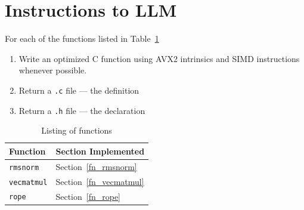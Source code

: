 \documentclass[letterpaper,12pt]{article}
\begin{document}
\section{Instructions to LLM}
For each of the functions listed in Table~\ref{list_of_fns}
\begin{enumerate}
  \item Write an optimized C function using AVX2 intrinsics and SIMD
    instructions whenever possible.
  \item Return a {\tt .c} file --- the definition
  \item Return a {\tt .h} file --- the declaration
\end{enumerate}
\begin{table}
\begin{tabular}{|l|l|} \hline \hline
  {\bf Function} & Section Implemented  \\ \hline \hline
  {\tt rmsnorm} & Section~\ref{fn_rmsnorm} \\ \hline
  {\tt vecmatmul} & Section~\ref{fn_vecmatmul} \\ \hline
  {\tt rope} & Section~\ref{fn_rope} \\ \hline
\end{tabular}
  \caption{Listing of functions}
  \label{list_of_fns}
\end{table}
\end{document}
